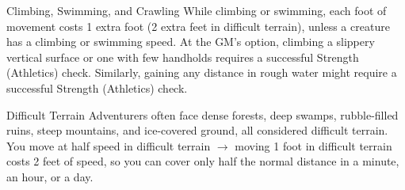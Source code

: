 \documentclass[a4paper,10pt,twoside,twocolumn]{dndbook} %
\begin{document}
	\begin{DndSidebar}{Climbing, Swimming, and Crawling}
		While climbing or swimming, each foot of movement costs 1 extra foot (2 extra feet in difficult terrain), unless a creature has a climbing or swimming speed. At the GM’s option, climbing a slippery vertical surface or one with few handholds requires a successful Strength (Athletics) check. Similarly, gaining any distance in rough water might require a successful Strength (Athletics) check. 
	\end{DndSidebar}
	\begin{DndSidebar}{Difficult Terrain}
		Adventurers often face dense forests, deep swamps, rubble-filled ruins, steep mountains, and ice-covered ground, all considered difficult terrain. You move at half speed in difficult terrain $\rightarrow$ moving 1 foot in difficult terrain costs 2 feet of speed, so you can cover only half the normal distance in a minute, an hour, or a day. 
	\end{DndSidebar}
	\pagebreak
\end{document}
